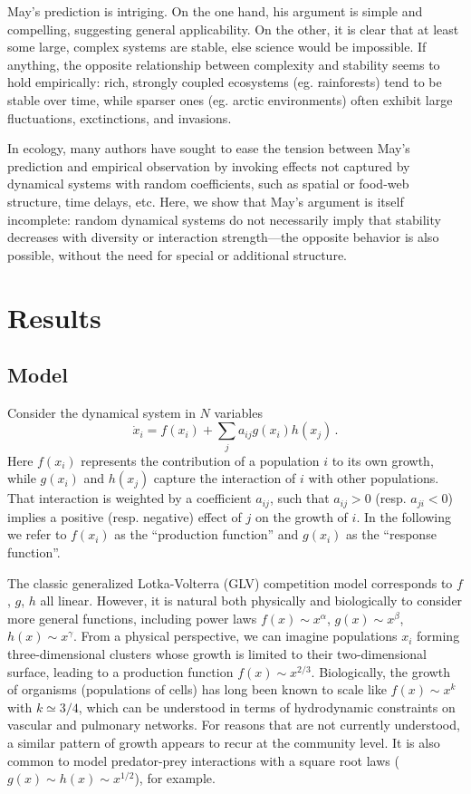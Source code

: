 \documentclass[%
 reprint,
 amsmath,amssymb,
 aps,
]{revtex4-2}
\begin{document}
May's prediction is intriging. On the one hand, his argument is simple and compelling, suggesting general applicability. 
On the other, it is clear that at least some large, complex systems are stable, else science would be impossible. 
If anything, the opposite relationship between complexity and stability seems to hold empirically: rich, strongly coupled ecosystems (eg. rainforests) tend to be stable over time, while sparser ones (eg. arctic environments) often exhibit large fluctuations, exctinctions, and invasions. 

In ecology, many authors have sought to ease the tension between May's prediction and empirical observation by invoking effects not captured by dynamical systems with random coefficients, such as spatial or food-web structure, time delays, etc. 
Here, we show that May's argument is itself incomplete: random dynamical systems do not necessarily imply that stability decreases with diversity or interaction strength---the opposite behavior is also possible, without the need for special or additional structure. 

\section{Results}

\subsection{Model}

Consider the dynamical system in $N$ variables
\begin{equation}\label{dynamics}
    \dot{x}_i = f(x_i) + \sum_{j}a_{ij}g(x_i)h(x_j) \, .
\end{equation}
Here $f(x_i)$ represents the contribution of a population $i$ to its own growth, while $g(x_i)$ and $h(x_j)$ capture the interaction of $i$ with other populations. 
That interaction is weighted by a coefficient $a_{ij}$, such that $a_{ij} > 0$ (resp. $a_{ji} < 0$) implies a positive (resp. negative) effect of $j$ on the growth of $i$. 
In the following we refer to $f(x_i)$ as the ``production function'' and $g(x_i)$ as the ``response function''. 

The classic generalized Lotka-Volterra (GLV) competition model corresponds to $f$, $g$, $h$ all linear. 
However, it is natural both physically and biologically to consider more general functions, including power laws $f(x)\sim x^\alpha$, $g(x)\sim x^\beta$, $h(x) \sim x^\gamma$. 
From a physical perspective, we can imagine populations $x_i$ forming three-dimensional clusters whose growth is limited to their two-dimensional surface, leading to a production function $f(x) \sim x^{2/3}$. 
Biologically, the growth of organisms (populations of cells) has long been known to scale like $f(x) \sim x^k$ with $k\simeq 3/4$, which can be understood in terms of hydrodynamic constraints on vascular and pulmonary networks. 
For reasons that are not currently understood, a similar pattern of growth appears to recur at the community level. 
It is also common to model predator-prey interactions with a square root laws ($g(x) \sim h(x) \sim x^{1/2}$), for example. 
\end{document}
